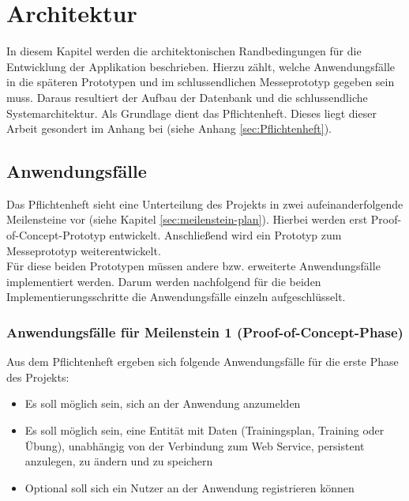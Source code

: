 \chapter{Architektur}
\label{cha:architektur}
In diesem Kapitel werden die architektonischen Randbedingungen für die Entwicklung der Applikation beschrieben. Hierzu zählt, welche Anwendungsfälle in die späteren Prototypen und im schlussendlichen Messeprototyp gegeben sein muss. Daraus resultiert der Aufbau der Datenbank und die schlussendliche Systemarchitektur. Als Grundlage dient das Pflichtenheft. Dieses liegt dieser Arbeit gesondert im Anhang bei (siehe Anhang \ref{sec:Pflichtenheft}).

\section{Anwendungsfälle}
\label{sec:anwendungsfaelle}
Das Pflichtenheft sieht eine Unterteilung des Projekts in zwei aufeinanderfolgende Meilensteine vor (siehe Kapitel \ref{sec:meilenstein-plan}). Hierbei werden erst Proof-of-Concept-Prototyp entwickelt. Anschließend wird ein Prototyp zum Messeprototyp weiterentwickelt. \\
Für diese beiden Prototypen müssen andere bzw. erweiterte Anwendungsfälle implementiert werden. Darum werden nachfolgend für die beiden Implementierungsschritte die Anwendungsfälle einzeln aufgeschlüsselt. 
\subsection{Anwendungsfälle für Meilenstein 1 (Proof-of-Concept-Phase)}
\label{ssec:anwendungsfaelle-poc}
Aus dem Pflichtenheft ergeben sich folgende Anwendungsfälle für die erste Phase des Projekts:
\begin{itemize}
\item Es soll möglich sein, sich an der Anwendung anzumelden
\item Es soll möglich sein, eine Entität mit Daten (Trainingsplan, Training oder Übung), unabhängig von der Verbindung zum Web Service, persistent anzulegen, zu ändern und zu speichern
\item Optional soll sich ein Nutzer an der Anwendung registrieren können
\end{itemize}

